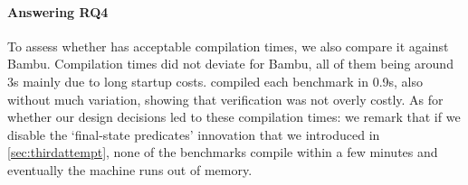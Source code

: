{\paragraph{Answering RQ4}
To assess whether \VericertHyper{} has acceptable compilation times, we also compare it against Bambu.  Compilation times did not deviate for Bambu, all of them being around 3s mainly due to long startup costs. \VericertHyper{} compiled each benchmark in 0.9s, also without much variation, showing that verification was not overly costly.  As for whether our design decisions led to these compilation times: we remark that if we disable the `final-state predicates' innovation that we introduced in \cref{sec:thirdattempt}, none of the benchmarks compile within a few minutes and eventually the machine runs out of memory.



}
